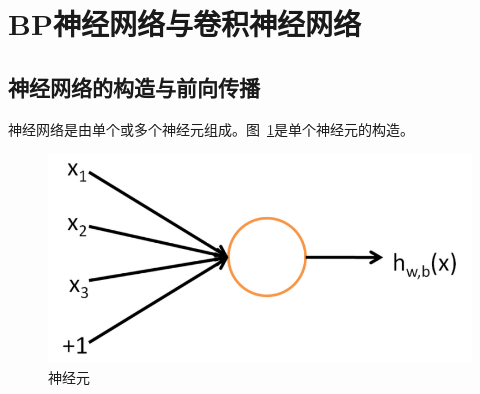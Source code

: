 \section{BP神经网络与卷积神经网络}
\subsection{神经网络的构造与前向传播}
神经网络是由单个或多个神经元组成。图~\ref{fig:bp1}是单个神经元的构造。
\begin{figure}[htb]
\centering
\includegraphics[scale=0.5]{../figures/NN1.png}
\caption{神经元}
\label{fig:bp1}
\end{figure}



